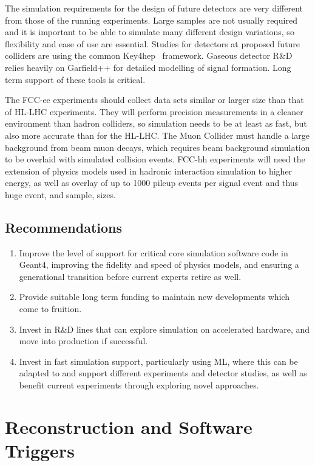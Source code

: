 \documentclass[10pt,a4paper]{article}
\begin{document}
The simulation requirements for the design of future detectors are very
different from those of the running experiments. Large samples are not
usually required and it is important to be able to simulate many
different design variations, so flexibility and ease of use are
essential. Studies for detectors at proposed future colliders are using
the common Key4hep~\cite{Ganis2022} framework. Gaseous detector R\&D relies
heavily on Garfield++\cite{garfield++} for detailed modelling of signal
formation. Long term support of these tools is critical.

The FCC-ee experiments should collect data sets similar or
larger size than that of HL-LHC experiments. They will perform precision
measurements in a cleaner environment than hadron colliders, so simulation
needs to be at least as fast, but also more accurate than for the HL-LHC. The
Muon Collider must handle a large background from beam muon decays, which
requires beam background simulation to be overlaid with simulated collision
events. FCC-hh experiments will need the extension of physics models used in
hadronic interaction simulation to higher energy, as well as overlay of up to
1000 pileup events per signal event and thus huge event, and sample, sizes.

\subsection{Recommendations}\label{recommendations-1}

\begin{enumerate}
\def\labelenumi{\arabic{enumi}.}
\item
  Improve the level of support for critical core simulation software code in
  Geant4, improving the fidelity and speed of physics models, and ensuring a
  generational transition before current experts retire as well.
\item
  Provide suitable long term funding to maintain new developments which
  come to fruition.
\item
  Invest in R\&D lines that can explore simulation on accelerated
  hardware, and move into production if successful.
\item
  Invest in fast simulation support, particularly using ML, where this
  can be adapted to and support different experiments and detector
  studies, as well as benefit current experiments through exploring
  novel approaches.
\end{enumerate}

\section{Reconstruction and Software
Triggers}\label{reconstruction-and-software-triggers}
\end{document}

